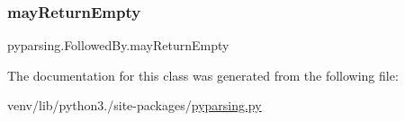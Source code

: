 \subsubsection{\texorpdfstring{may\+Return\+Empty}{mayReturnEmpty}}
{\footnotesize\ttfamily pyparsing.\+Followed\+By.\+may\+Return\+Empty}



The documentation for this class was generated from the following file\+:\begin{DoxyCompactItemize}
\item 
venv/lib/python3./site-\/packages/\hyperlink{pyparsing_8py}{pyparsing.\+py}\end{DoxyCompactItemize}
